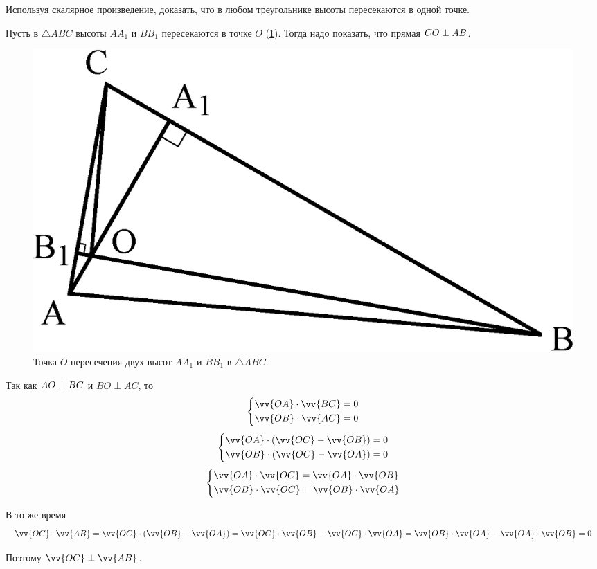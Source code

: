 \documentclass[a4paper,12pt]{article}
\begin{document}
  
  \begin{problem}
    Используя скалярное произведение, доказать, что в любом треугольнике высоты пересекаются в одной точке.
  \end{problem}
  
  \begin{solution}
    Пусть в $\triangle ABC$ высоты $AA_1$ и $BB_1$ пересекаются в точке $O$ (\ref{fig:triangle-with-two-hs}).
    Тогда надо показать, что прямая $CO \hm\perp AB$.
    
    \begin{figure}[h]
      \centering
    
      \includegraphics[width=0.5\columnwidth]{triangle-with-two-hs}
    
      \caption{Точка $O$ пересечения двух высот $AA_1$ и $BB_1$ в $\triangle ABC$.}
      \label{fig:triangle-with-two-hs}
    \end{figure}
  
    Так как $AO \hm\perp BC$ и $BO \perp AC$, то
    \[
      \left\{
        \begin{aligned}
          &\vv{OA} \cdot \vv{BC} = 0\\
          &\vv{OB} \cdot \vv{AC} = 0
        \end{aligned}
      \right.
    \]
    \[
      \left\{
        \begin{aligned}
          &\vv{OA} \cdot (\vv{OC} - \vv{OB}) = 0\\
          &\vv{OB} \cdot (\vv{OC} - \vv{OA}) = 0
        \end{aligned}
      \right.
    \]
    \[
      \left\{
        \begin{aligned}
          &\vv{OA} \cdot \vv{OC} = \vv{OA} \cdot \vv{OB}\\
          &\vv{OB} \cdot \vv{OC} = \vv{OB} \cdot \vv{OA}
        \end{aligned}
      \right.
    \]
    
    В то же время
    \[
      \vv{OC} \cdot \vv{AB} = \vv{OC} \cdot (\vv{OB} - \vv{OA}) = \vv{OC} \cdot \vv{OB} - \vv{OC} \cdot \vv{OA}
        = \vv{OB} \cdot \vv{OA} - \vv{OA} \cdot \vv{OB} = 0
    \]
    
    Поэтому $\vv{OC} \hm\perp \vv{AB}$.
  \end{solution}
  
\end{document}
